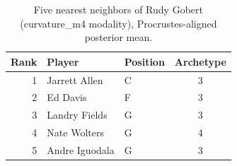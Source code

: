 \begin{table}[htbp]
  \centering\small
  \begin{tabular}{rllc}
    \toprule
    Rank & Player & Position & Archetype \\
    \midrule
    1 & Jarrett Allen & C & 3 \\
    2 & Ed Davis & F & 3 \\
    3 & Landry Fields & G & 3 \\
    4 & Nate Wolters & G & 4 \\
    5 & Andre Iguodala & G & 3 \\
    \bottomrule
  \end{tabular}
  \caption{Five nearest neighbors of Rudy Gobert (curvature_m4 modality), Procrustes-aligned posterior mean.}
  \label{tab:Rudy_Gobert_neighbors_curvature_m4}
\end{table}


